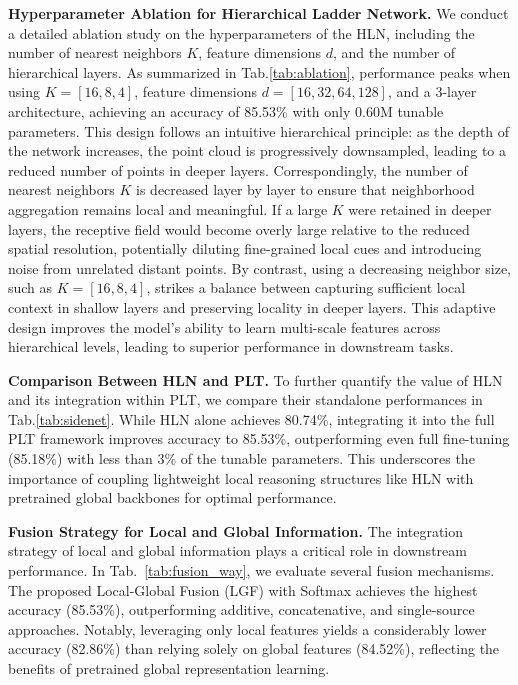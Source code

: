 \textbf{Hyperparameter Ablation for Hierarchical Ladder Network.} We conduct a detailed ablation study on the hyperparameters of the HLN, including the number of nearest neighbors $K$, feature dimensions $d$, and the number of hierarchical layers. As summarized in Tab.\ref{tab:ablation}, performance peaks when using $K=[16,8,4]$, feature dimensions $d=[16,32,64,128]$, and a 3-layer architecture, achieving an accuracy of 85.53\% with only 0.60M tunable parameters. This design follows an intuitive hierarchical principle: as the depth of the network increases, the point cloud is progressively downsampled, leading to a reduced number of points in deeper layers. Correspondingly, the number of nearest neighbors $K$ is decreased layer by layer to ensure that neighborhood aggregation remains local and meaningful. If a large $K$ were retained in deeper layers, the receptive field would become overly large relative to the reduced spatial resolution, potentially diluting fine-grained local cues and introducing noise from unrelated distant points. By contrast, using a decreasing neighbor size, such as $K=[16,8,4]$, strikes a balance between capturing sufficient local context in shallow layers and preserving locality in deeper layers. This adaptive design improves the model’s ability to learn multi-scale features across hierarchical levels, leading to superior performance in downstream tasks.

\textbf{Comparison Between HLN and PLT.} To further quantify the value of HLN and its integration within PLT, we compare their standalone performances in Tab.\ref{tab:sidenet}. While HLN alone achieves 80.74\%, integrating it into the full PLT framework improves accuracy to 85.53\%, outperforming even full fine-tuning (85.18\%) with less than 3\% of the tunable parameters. This underscores the importance of coupling lightweight local reasoning structures like HLN with pretrained global backbones for optimal performance.

\textbf{Fusion Strategy for Local and Global Information.} The integration strategy of local and global information plays a critical role in downstream performance. In Tab.~\ref{tab:fusion_way}, we evaluate several fusion mechanisms. The proposed Local-Global Fusion (LGF) with Softmax achieves the highest accuracy (85.53\%), outperforming additive, concatenative, and single-source approaches. Notably, leveraging only local features yields a considerably lower accuracy (82.86\%) than relying solely on global features (84.52\%), reflecting the benefits of pretrained global representation learning.

